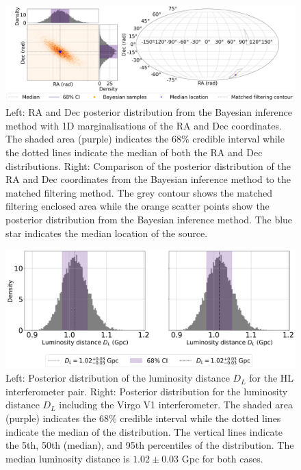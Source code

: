 \documentclass[11pt,a4paper]{article}
\begin{document}
\begin{landscape}
\begin{figure}
    \includegraphics[width=\columnwidth, keepaspectratio]{../figures/radec_posterior_HLV.png}
    \caption{Left: RA and Dec posterior distribution from the Bayesian inference method with 1D marginalisations of the RA and Dec coordinates. The shaded area (purple) indicates the 68\% credible interval while the dotted lines indicate the median of both the RA and Dec distributions. Right: Comparison of the posterior distribution of the RA and Dec coordinates from the Bayesian inference method to the matched filtering method. The grey contour shows the matched filtering enclosed area while the orange scatter points show the posterior distribution from the Bayesian inference method. The blue star indicates the median location of the source.}
    \label{fig:hlv_compare}
\end{figure}
\end{landscape}

\begin{figure}
    \includegraphics[width=\columnwidth, keepaspectratio]{../figures/dl_posterior.png}
    \caption{Left: Posterior distribution of the luminosity distance $D_L$ for the HL interferometer pair. Right: Posterior distribution for the luminosity distance $D_L$ including the Virgo V1 interferometer. The shaded area (purple) indicates the 68\% credible interval while the dotted lines indicate the median of the distribution. The vertical lines indicate the 5th, 50th (median), and 95th percentiles of the distribution. The median luminosity distance is $1.02 \pm 0.03$ Gpc for both cases.}
    \label{fig:luminosity_distance}
\end{figure}
\end{document}
